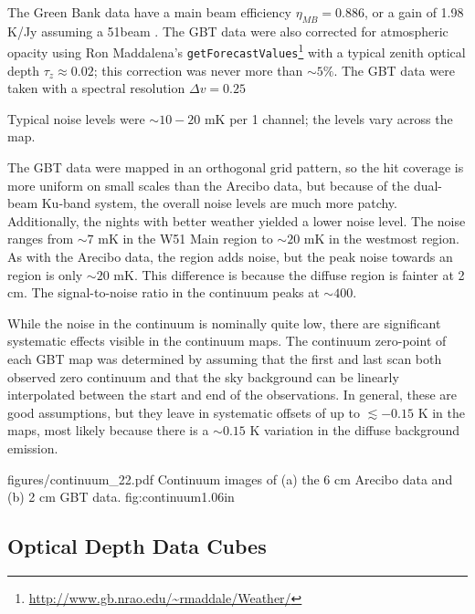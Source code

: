 
The Green Bank data have a main beam efficiency $\eta_{MB} = 0.886$, or a gain
of 1.98 K/Jy assuming a 51\arcsec beam \citep[see][for additional
discussion]{Mangum2013a}.  The GBT data were also corrected for atmospheric
opacity using Ron Maddalena's
\texttt{getForecastValues}\footnote{\url{http://www.gb.nrao.edu/~rmaddale/Weather/}}
with a typical zenith optical depth $\tau_{z}\approx0.02$; this
correction was never more than $\sim5\%$.
The GBT data were taken with a spectral resolution $\Delta v = 0.25$ \kms

Typical noise levels were $\sim10-20$ mK per 1 \kms channel; the levels vary
across the map.  

The GBT data were mapped in an orthogonal grid pattern, so the hit coverage is
more uniform on small scales than the Arecibo data, but because of the
dual-beam Ku-band system, the overall noise levels are much more patchy.
Additionally, the nights with
better weather yielded a lower noise level.  The noise ranges from $\sim7$ mK
in the W51 Main region to $\sim 20$ mK in the westmost region.  As with the
Arecibo data, the \hii region adds noise, but the peak noise towards an \hii
region is only $\sim 20$ mK.  This difference is because the diffuse \hii
region is fainter at 2 cm.  The signal-to-noise ratio in the continuum peaks at
$\sim 400$.

While the noise in the continuum is nominally quite low, there are significant
systematic effects visible in the continuum maps.  The continuum zero-point of
each GBT map was determined by assuming that the first and last scan both
observed zero continuum and that the sky background can be linearly
interpolated between the start and end of the observations.  In general, these
are good assumptions, but they leave in systematic offsets of up to
$\lesssim-0.15$ K in the maps, most likely because there is a $\sim0.15$ K
variation in the diffuse background  emission.



            {figures/continuum_22.pdf}
{Continuum images of (a) the 6 cm Arecibo data and (b) 2 cm GBT
data.} {fig:continuum}{1.0}{6in}




\subsection{Optical Depth Data Cubes}


